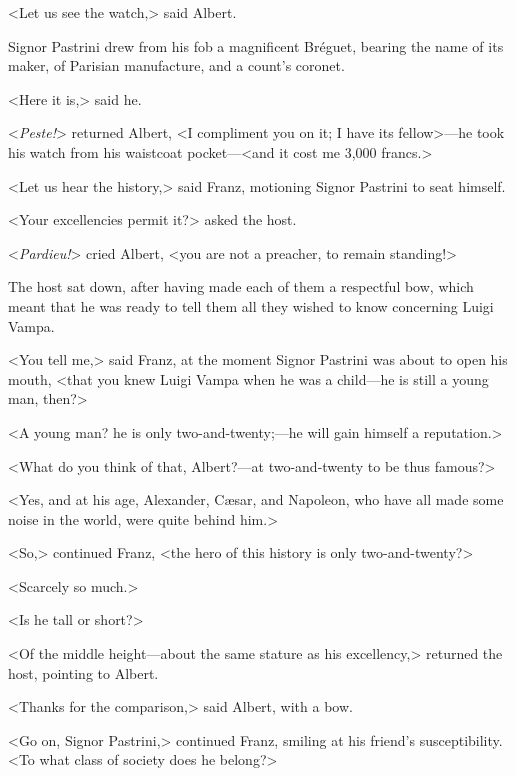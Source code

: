  <Let us see the watch,> said Albert. 

 Signor Pastrini drew from his fob a magnificent Bréguet, bearing the name of its maker, of Parisian manufacture, and a count's coronet. 

 <Here it is,> said he. 

 <\textit{Peste!}> returned Albert, <I compliment you on it; I have its fellow>—he took his watch from his waistcoat pocket—<and it cost me 3,000 francs.> 

 <Let us hear the history,> said Franz, motioning Signor Pastrini to seat himself. 

 <Your excellencies permit it?> asked the host. 

 <\textit{Pardieu!}> cried Albert, <you are not a preacher, to remain standing!> 

 The host sat down, after having made each of them a respectful bow, which meant that he was ready to tell them all they wished to know concerning Luigi Vampa. 

 <You tell me,> said Franz, at the moment Signor Pastrini was about to open his mouth, <that you knew Luigi Vampa when he was a child—he is still a young man, then?> 

 <A young man? he is only two-and-twenty;—he will gain himself a reputation.> 

 <What do you think of that, Albert?—at two-and-twenty to be thus famous?> 

 <Yes, and at his age, Alexander, Cæsar, and Napoleon, who have all made some noise in the world, were quite behind him.> 

 <So,> continued Franz, <the hero of this history is only two-and-twenty?> 

 <Scarcely so much.> 

 <Is he tall or short?> 

 <Of the middle height—about the same stature as his excellency,> returned the host, pointing to Albert. 

 <Thanks for the comparison,> said Albert, with a bow. 

 <Go on, Signor Pastrini,> continued Franz, smiling at his friend's susceptibility. <To what class of society does he belong?> 

